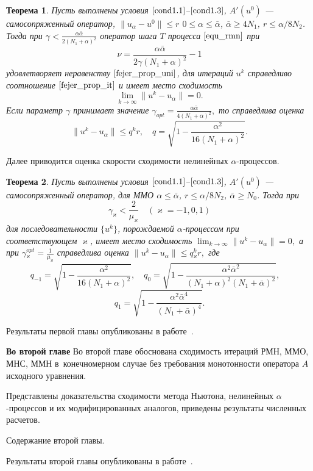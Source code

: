 \documentclass[%
autoref,     %
href,        %
facsimile,   %
colorlinks,  %
]{disser}
\newtheorem{theorem}{Теорема}[chapter]
\begin{document}
\begin{theorem} \label{teo2.3}
	Пусть выполнены условия $\eqref{cond1.1}$--$\eqref{cond1.3}$, $A'(u^0)$ --- самосопряженный оператор, $\|u_\alpha-u^0\|\leqslant r$ 
$0\leqslant\alpha\leqslant\bar\alpha$, $\bar\alpha\geqslant 4N_1$, $r\leqslant\alpha/8N_2$. Тогда при
	$\gamma<\frac{\alpha\bar\alpha}{2(N_1+\alpha)^2}$
	оператор шага $T$ процесса $\eqref{equ_rmn}$ при
	$$\nu=\frac{\alpha\bar\alpha}{2\gamma(N_1+\alpha)^2}-1$$
	удовлетворяет неравенству $\eqref{fejer_prop_uni}$, для итераций $u^k$ справедливо соотношение $\eqref{fejer_prop_it}$ и имеет место сходимость
	$$\lim_{k\to\infty}\|u^k-u_\alpha\|=0.$$
	Если параметр $\gamma$ принимает значение ${\gamma}_{opt}=\frac{\alpha\bar\alpha}{4(N_1+\alpha)^2},$ то справедлива оценка $$\|u^k-u_\alpha\|\leqslant q^k r, \quad q=\sqrt{1-\frac{{\alpha}^2}  {16(N_1+\alpha)^2}}.$$
\end{theorem}

Далее приводится оценка скорости сходимости нелинейных $\alpha$-процессов.
\begin{theorem}\label{teo3.2}
	Пусть выполнены условия $\eqref{cond1.1}$--$\eqref{cond1.3}$, $A'(u^0)$ --- самосопряженный оператор, для ММО $\alpha \leqslant \bar\alpha$,  $r\leqslant \alpha/8N_2$, $\bar\alpha \geqslant N_0$.  Тогда при
	$$\gamma _\varkappa <\frac{2}{\mu _\varkappa}\quad (\varkappa=-1,0,1)$$
	для последовательности $\{u^k\}$, порождаемой $\alpha$-процессом при соответствующем $\varkappa$, имеет место сходимость $\lim_{k\to\infty}\|u^k-u_\alpha\|=0, $ а при 
	$\gamma{_\varkappa^{opt}}=\frac{1}{\mu_\varkappa}$
	справедлива оценка $\|u^k-u_\alpha\|\leqslant q{_\varkappa^k}r,$ где
	$$
	q_{-1}=\sqrt{1-\frac{\alpha^2}{16(N_1+\alpha)^2}}, \quad q_0=\sqrt{1-\frac{\alpha^2\bar\alpha^2}{(N_1+\alpha)^2(N_1+\bar\alpha)^2}}, \quad $$$$q_1=\sqrt{1-\frac{\alpha^2\bar\alpha^4}{(N_1+\bar\alpha)^4}}.
	$$
\end{theorem}

Результаты первой главы опубликованы в работе~\cite{VasSkur2017,}.

\textbf{Во второй главе} Во второй главе обоснована сходимость итераций РМН, ММО, МНС, ММН в~конечномерном случае без требования монотонности оператора $A$ исходного уравнения.

Представлены доказательства сходимости метода Ньютона, нелинейных $\alpha$-процессов и их модифицированных аналогов, приведены результаты численных расчетов.

Содержание второй главы.

Результаты второй главы опубликованы в работе~\cite{VasSkur2017,VasSkur2015}.
\end{document}
